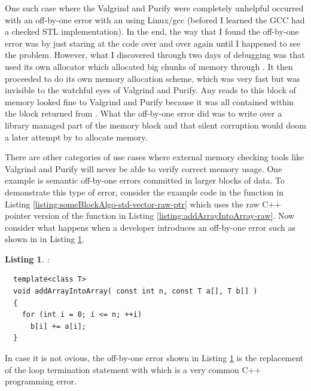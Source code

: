 \documentclass[pdf,ps2pdf,11pt]{SANDreport}
\newtheorem{listing}{Listing}
\begin{document}
One such case where the Valgrind and Purify were completely unhelpful
occurred with an off-by-one error with an {} using
Linux/gcc (befored I learned the GCC had a checked STL
implementation).  In the end, the way that I found the off-by-one
error was by just staring at the code over and over again until I
happened to see the problem.  However, what I discovered through two
days of debugging was that {} used its own allocator
which allocated big chunks of memory through {}.  It
then proceeded to do its own memory allocation scheme, which was very
fast but was invisible to the watchful eyes of Valgrind and Purify.
Any reads to this block of memory looked fine to Valgrind and Purify
because it was all contained within the block returned from
{}.  What the off-by-one error did was to write over
a library managed part of the memory block and that silent corruption
would doom a later attempt by {} to allocate memory.

There are other categories of use cases where external memory checking
tools like Valgrind and Purify will never be able to verify correct
memory usage.  One example is semantic off-by-one errors committed in
larger blocks of data.  To demonstrate this type of error, consider
the example code in the function {} in Listing
{}\ref{listing:someBlockAlgo-std-vector-raw-ptr} which uses the raw
C++ pointer version of the function {} in
Listing {}\ref{listing:addArrayIntoArray-raw}.  Now consider what
happens when a developer introduces an off-by-one error such as shown
in {} in Listing
{}\ref{listing:addArrayIntoArray_rawError}.

\begin{listing}:\\
\label{listing:addArrayIntoArray_rawError}
{\small\begin{verbatim}
  template<class T>
  void addArrayIntoArray( const int n, const T a[], T b[] )
  {
    for (int i = 0; i <= n; ++i)
      b[i] += a[i];
  }
\end{verbatim}}
\end{listing}

In case it is not ovious, the off-by-one error shown in Listing
{}\ref{listing:addArrayIntoArray_rawError} is the replacement of the
loop termination statement {} with {} which is
a very common C++ programming error.
\end{document}
